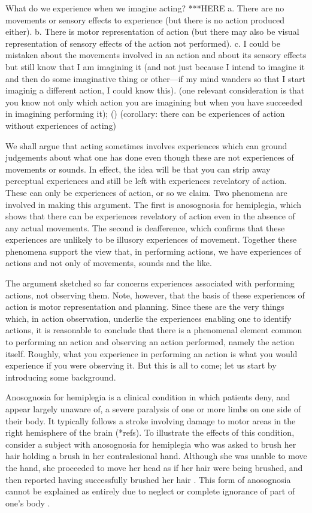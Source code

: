 \documentclass[12pt,\papersize]{extarticle}
\begin{document}
What do we experience when we imagine acting?  ***HERE
a.  There are no movements or sensory effects to experience (but there is  no action produced either).
b.  There is motor representation of action (but there may also be visual representation of sensory effects of the action not performed).
c.  I could be mistaken about the movements involved in an action and about its sensory effects but still know that I am imagining it (and not just because I intend to imagine it and then do some imaginative thing or other---if my mind wanders so that I start imaginig a different action, I could know this).
(one relevant consideration is that you know not only which action you are imagining but when you have succeeded in imagining performing it); ()
(corollary: there can be experiences of action without experiences of acting)




We shall argue that acting sometimes involves experiences which can ground judgements about what one has done even though these are not experiences of movements or sounds.  In effect, the idea will be that you can strip away perceptual experiences and still be left with experiences revelatory of action.  These can only be experiences of action, or so we claim.  Two phenomena are involved in making this argument.  The first is anosognosia for hemiplegia, which shows that there can be experiences revelatory of action even in the absence of any actual movements.  The second is deafference, which confirms that these experiences are unlikely to be illusory experiences of movement. Together these phenomena support the view that, in performing actions, we have experiences of actions and not only of movements, sounds and the like.  

The argument sketched so far concerns experiences associated with performing actions, not observing them.  Note, however, that the basis of these experiences of action is motor representation and planning.  Since these are the very things which, in action observation, underlie the experiences enabling one to identify actions, it is reasonable to conclude that there is a phenomenal element common to performing an action and observing an action performed, namely the action itself.  Roughly, what you experience in performing an action is what you would experience if you were observing it.  But this is all to come; let us start by introducing some background. 

Anosognosia for hemiplegia is a clinical condition in which patients deny, and appear largely unaware of, a severe paralysis of one or more limbs on one side of their body.  It typically follows a stroke involving damage to motor areas in the right hemisphere of the brain (*refs).  To illustrate the effects of this condition, consider a subject with anosognosia for hemiplegia who was asked to brush her hair holding a brush in her contralesional hand.  Although she was unable to move the hand, she proceeded to move her head as if her hair were being brushed, and then reported having successfully brushed her hair \citep{berti:2008_motor}. This form of anosognosia cannot be explained as entirely due to neglect or complete ignorance of part of one's body \citep[p.\ 165]{berti:2008_motor}.  
\end{document}
